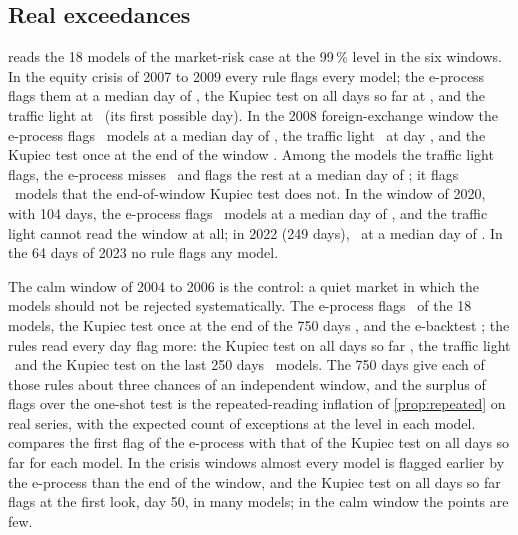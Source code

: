 

\subsection{Real exceedances}
\label{sec:results-c11}

 reads the 18 models of the market-risk case at the 99\,\% level in the six windows. In the equity crisis of 2007 to 2009 every rule flags every model; the e-process flags them at a median day of \nCElevenEquityNinetyEMed, the Kupiec test on all days so far at \nCElevenEquityNinetyKupCumMed, and the traffic light at \nCElevenEquityNinetyLightMed\ (its first possible day). In the 2008 foreign-exchange window the e-process flags \nCElevenFxNinetyEFlag\ models at a median day of \nCElevenFxNinetyEMed, the traffic light \nCElevenFxNinetyLightFlag\ at day \nCElevenFxNinetyLightMed,
and the Kupiec test once at the end of the window \nCElevenFxNinetyKupEndFlag. Among the models the traffic light flags, the e-process misses \nCElevenFxNinetyLightMissedByE\ and flags the rest at a median day of \nCElevenFxNinetyLightE; it flags \nCElevenFxNinetyEOnlyVsKupiecEnd\ models that the end-of-window Kupiec test does not. In the window of 2020, with 104 days, the e-process flags \nCElevenCovidNinetyEFlag\ models at a median day of \nCElevenCovidNinetyEMed, and the traffic light cannot read the window at all; in 2022 (249 days), \nCElevenRatesNinetyEFlag\ at a median day of \nCElevenRatesNinetyEMed. In the 64 days of 2023 no rule flags any model.



The calm window of 2004 to 2006 is the control: a quiet market in which the models should not be rejected systematically. The e-process flags \nCElevenCalmNinetyEFlag\ of the 18 models, the Kupiec test once at the end of the 750 days \nCElevenCalmNinetyKupEndFlag, and the e-backtest \nCElevenCalmNinetyWwzFlag; the rules read every day flag more: the Kupiec test on all days so far \nCElevenCalmNinetyKupCumFlag, the traffic light \nCElevenCalmNinetyLightFlag\ and the Kupiec test on the last 250 days \nCElevenCalmNinetyKupTrailFlag\ models. The 750 days give each of those rules
about three chances of an independent window, and the surplus of flags over the one-shot test is the repeated-reading inflation of \cref{prop:repeated} on real series, with the expected count of exceptions at the level in each model.
 compares the first flag of the e-process with that of the Kupiec test on all days so far for each model. In the crisis windows almost every model is flagged earlier by the e-process than the end of the window, and the Kupiec test on all days so far flags at the first look, day 50, in many models; in the calm window the points are few.


